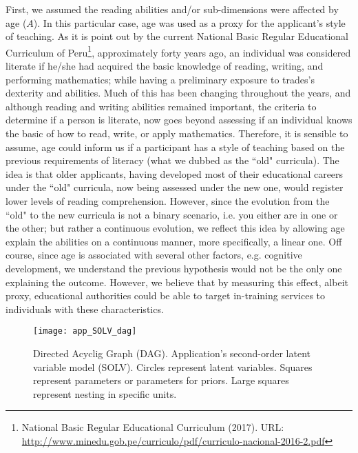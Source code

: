 First, we assumed the reading abilities and/or sub-dimensions were affected by age ($A$). In this particular case, age was used as a proxy for the applicant's style of teaching. As it is point out by the current National Basic Regular Educational Curriculum of Peru\footnote{National Basic Regular Educational Curriculum (2017). URL: \url{ http://www.minedu.gob.pe/curriculo/pdf/curriculo-nacional-2016-2.pdf} }, approximately forty years ago, an individual was considered literate if he/she had acquired the basic knowledge of reading, writing, and performing mathematics; while having a preliminary exposure to trades's dexterity and abilities. Much of this has been changing throughout the years, and although reading and writing abilities remained important, the criteria to determine if a person is literate, now goes beyond assessing if an individual knows the basic of how to read, write, or apply mathematics. Therefore, it is sensible to assume, age could inform us if a participant has a style of teaching based on the previous requirements of literacy (what we dubbed as the ``old" curricula). The idea is that older applicants, having developed most of their educational careers under the ``old" curricula, now being assessed under the new one, would register lower levels of reading comprehension. However, since the evolution from the ``old" to the new curricula is not a binary scenario, i.e. you either are in one or the other; but rather a continuous evolution, we reflect this idea by allowing age explain the abilities on a continuous manner, more specifically, a linear one. Off course, since age is associated with several other factors, e.g. cognitive development, we understand the previous hypothesis would not be the only one explaining the outcome. However, we believe that by measuring this effect, albeit proxy, educational authorities could be able to target in-training services to individuals with these characteristics.
%
\begin{figure}[H]
	\centering
	\texttt{[image: app\_SOLV\_dag]}
	\caption[Directed Acyclic Graph (DAG). Application's second-order latent variable model (SOLV).]%
	{Directed Acyclig Graph (DAG). Application's second-order latent variable model (SOLV). Circles represent latent variables. Squares represent parameters or parameters for priors. Large squares represent nesting in specific units.}
	\label{fig:SOLV_app}
\end{figure}

